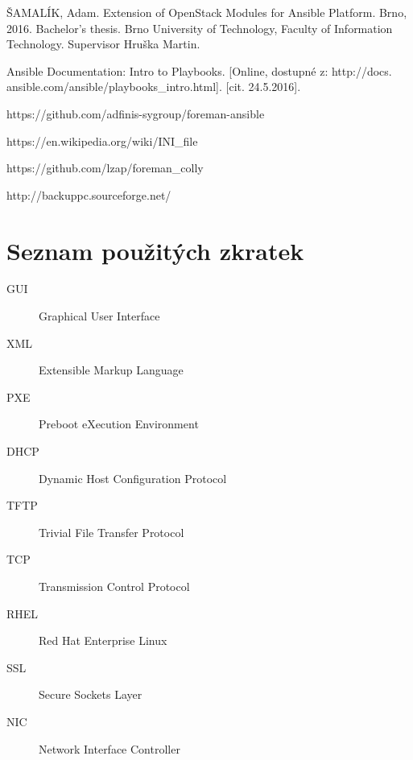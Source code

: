 \documentclass[thesis=B,czech]{FITthesis}[2012/06/26]
\begin{document}
\begin{itemize}
\begin{thebibliography}{9}

ŠAMALÍK, Adam. Extension of OpenStack Modules for Ansible Platform. Brno, 2016. Bachelor’s thesis. Brno University of Technology, Faculty of Information Technology. Supervisor Hruška Martin.


Ansible Documentation: Intro to Playbooks. [Online, dostupné z: http://docs.
ansible.com/ansible/playbooks\_{}intro.html]. [cit. 24.5.2016].


https://github.com/adfinis-sygroup/foreman-ansible

https://en.wikipedia.org/wiki/INI\_{}file


https://github.com/lzap/foreman\_{}colly

http://backuppc.sourceforge.net/

\end{thebibliography}


\appendix

\chapter{Seznam použitých zkratek}
\begin{description}
	\item[GUI] Graphical User Interface
	\item[XML] Extensible Markup Language
	\item[PXE] Preboot eXecution Environment
	\item[DHCP] Dynamic Host Configuration Protocol
	\item[TFTP] Trivial File Transfer Protocol
	\item[TCP] Transmission Control Protocol
	\item[RHEL] Red Hat Enterprise Linux
	\item[SSL] Secure Sockets Layer
	\item[NIC] Network Interface Controller
\end{description}




\end{itemize}
\end{document}

